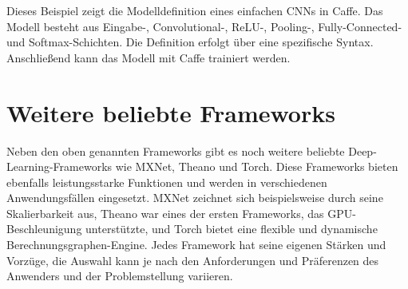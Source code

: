 Dieses Beispiel zeigt die Modelldefinition eines einfachen CNNs in Caffe. Das Modell besteht aus Eingabe-, Convolutional-, ReLU-, Pooling-, Fully-Connected- und Softmax-Schichten. Die Definition erfolgt über eine spezifische Syntax. Anschließend kann das Modell mit Caffe trainiert werden.

\section{Weitere beliebte Frameworks}
Neben den oben genannten Frameworks gibt es noch weitere beliebte Deep-Learning-Frameworks wie MXNet, Theano und Torch. Diese Frameworks bieten ebenfalls leistungsstarke Funktionen und werden in verschiedenen Anwendungsfällen eingesetzt. MXNet zeichnet sich beispielsweise durch seine Skalierbarkeit aus, Theano war eines der ersten Frameworks, das GPU-Beschleunigung unterstützte, und Torch bietet eine flexible und dynamische Berechnungsgraphen-Engine. Jedes Framework hat seine eigenen Stärken und Vorzüge, die Auswahl kann je nach den Anforderungen und Präferenzen des Anwenders und der Problemstellung variieren.
